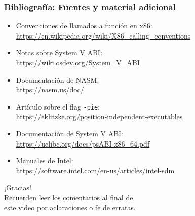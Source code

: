 \documentclass[aspectratio=169]{beamer}
\begin{document}
\begin{frame}[fragile]
    \frametitle{Bibliografía: Fuentes y material adicional}
    \begin{itemize}
    \item Convenciones de llamados a función en x86: \\
    \url{https://en.wikipedia.org/wiki/X86_calling_conventions}
    \item Notas sobre System V ABI: \\
    \url{https://wiki.osdev.org/System_V_ABI}
    \item Documentación de NASM: \\
    \url{https://nasm.us/doc/}
    \item Artículo sobre el flag \texttt{-pie}: \\
    \url{https://eklitzke.org/position-independent-executables}
    \item Documentación de System V ABI: \\
    \url{https://uclibc.org/docs/psABI-x86_64.pdf}
    \item Manuales de Intel: \\
    \url{https://software.intel.com/en-us/articles/intel-sdm}
    \end{itemize}
\end{frame}

\begin{frame}[plain]
    \begin{center}
    \vspace{2cm}
    \huge ¡Gracias!\\
    \vspace{2cm}
    \normalsize Recuerden leer los comentarios al final de \\ este video por aclaraciones o fe de erratas.
    \end{center}
\end{frame}
\end{document}
